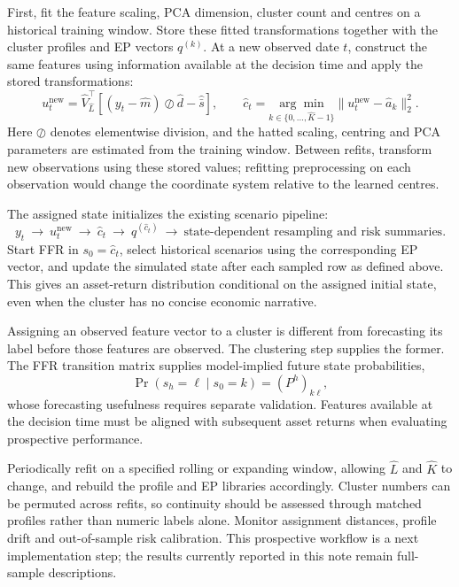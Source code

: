 \documentclass[11pt,a4paper]{article}
\begin{document}
First, fit the feature scaling, PCA dimension, cluster count and centres on a historical training window. Store these fitted transformations together with the cluster profiles and EP vectors $q^{(k)}$. At a new observed date $t$, construct the same features using information available at the decision time and apply the stored transformations:
\begin{equation}
u_t^{\mathrm{new}}=
\widehat V_{\widehat L}^{\top}
\left[(y_t-\widehat m)\oslash\widehat d-\widehat{\bar s}\right],
\qquad
\widehat c_t=\underset{k\in\{0,\ldots,\widehat K-1\}}{\arg\min}
\|u_t^{\mathrm{new}}-\widehat a_k\|_2^2.
\label{eq:new-state-assignment}
\end{equation}
Here $\oslash$ denotes elementwise division, and the hatted scaling, centring and PCA parameters are estimated from the training window. Between refits, transform new observations using these stored values; refitting preprocessing on each observation would change the coordinate system relative to the learned centres.

The assigned state initializes the existing scenario pipeline:
\[
y_t\ \longrightarrow\ u_t^{\mathrm{new}}\ \longrightarrow\
\widehat c_t\ \longrightarrow\ q^{(\widehat c_t)}\
\longrightarrow\ \text{state-dependent resampling and risk summaries}.
\]
Start FFR in $s_0=\widehat c_t$, select historical scenarios using the corresponding EP vector, and update the simulated state after each sampled row as defined above. This gives an asset-return distribution conditional on the assigned initial state, even when the cluster has no concise economic narrative.

Assigning an observed feature vector to a cluster is different from forecasting its label before those features are observed. The clustering step supplies the former. The FFR transition matrix supplies model-implied future state probabilities,
\begin{equation}
\Pr(s_h=\ell\mid s_0=k)=(P^h)_{k\ell},
\end{equation}
whose forecasting usefulness requires separate validation. Features available at the decision time must be aligned with subsequent asset returns when evaluating prospective performance.

Periodically refit on a specified rolling or expanding window, allowing $\widehat L$ and $\widehat K$ to change, and rebuild the profile and EP libraries accordingly. Cluster numbers can be permuted across refits, so continuity should be assessed through matched profiles rather than numeric labels alone. Monitor assignment distances, profile drift and out-of-sample risk calibration. This prospective workflow is a next implementation step; the results currently reported in this note remain full-sample descriptions.
\end{document}
